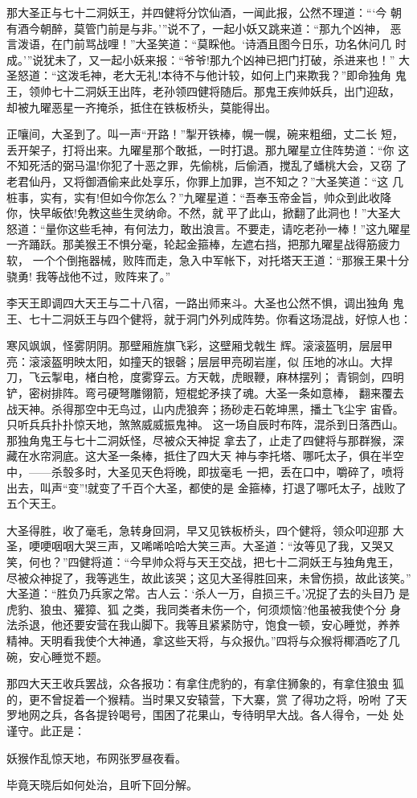 那大圣正与七十二洞妖王，并四健将分饮仙酒，一闻此报，公然不理道：“‘今
朝有酒今朝醉，莫管门前是与非。’”说不了，一起小妖又跳来道：“那九个凶神，
恶言泼语，在门前骂战哩！”大圣笑道：“莫睬他。‘诗酒且图今日乐，功名休问几
时成。’”说犹未了，又一起小妖来报：“爷爷!那九个凶神已把门打破，杀进来也！”
大圣怒道：“这泼毛神，老大无礼!本待不与他计较，如何上门来欺我？”即命独角
鬼王，领帅七十二洞妖王出阵，老孙领四健将随后。那鬼王疾帅妖兵，出门迎敌，
却被九曜恶星一齐掩杀，抵住在铁板桥头，莫能得出。

正嚷间，大圣到了。叫一声“开路！”掣开铁棒，幌一幌，碗来粗细，丈二长
短，丢开架子，打将出来。九曜星那个敢抵，一时打退。那九曜星立住阵势道：“你
这不知死活的弼马温!你犯了十恶之罪，先偷桃，后偷酒，搅乱了蟠桃大会，又窃
了老君仙丹，又将御酒偷来此处享乐，你罪上加罪，岂不知之？”大圣笑道：“这
几桩事，实有，实有!但如今你怎么？”九曜星道：“吾奉玉帝金旨，帅众到此收降
你，快早皈依!免教这些生灵纳命。不然，就平了此山，掀翻了此洞也！”大圣大
怒道：“量你这些毛神，有何法力，敢出浪言。不要走，请吃老孙一棒！”这九曜星
一齐踊跃。那美猴王不惧分毫，轮起金箍棒，左遮右挡，把那九曜星战得筋疲力软，
一个个倒拖器械，败阵而走，急入中军帐下，对托塔天王道：“那猴王果十分骁勇!
我等战他不过，败阵来了。”

李天王即调四大天王与二十八宿，一路出师来斗。大圣也公然不惧，调出独角
鬼王、七十二洞妖王与四个健将，就于洞门外列成阵势。你看这场混战，好惊人也：

寒风飒飒，怪雾阴阴。那壁厢旌旗飞彩，这壁厢戈戟生
辉。滚滚盔明，层层甲亮：滚滚盔明映太阳，如撞天的银磬；层层甲亮砌岩崖，似
压地的冰山。大捍刀，飞云掣电，楮白枪，度雾穿云。方天戟，虎眼鞭，麻林摆列；
青铜剑，四明铲，密树排阵。弯弓硬弩雕翎箭，短棍蛇矛挟了魂。大圣一条如意棒，
翻来覆去战天神。杀得那空中无鸟过，山内虎狼奔；扬砂走石乾坤黑，播土飞尘宇
宙昏。只听兵兵扑扑惊天地，煞煞威威振鬼神。
这一场自辰时布阵，混杀到日落西山。那独角鬼王与七十二洞妖怪，尽被众天神捉
拿去了，止走了四健将与那群猴，深藏在水帘洞底。这大圣一条棒，抵住了四大天
神与李托塔、哪吒太子，俱在半空中，——杀彀多时，大圣见天色将晚，即拔毫毛
一把，丢在口中，嚼碎了，喷将出去，叫声“变”!就变了千百个大圣，都使的是
金箍棒，打退了哪吒太子，战败了五个天王。

大圣得胜，收了毫毛，急转身回洞，早又见铁板桥头，四个健将，领众叩迎那
大圣，哽哽咽咽大哭三声，又唏唏哈哈大笑三声。大圣道：“汝等见了我，又哭又
笑，何也？”四健将道：“今早帅众将与天王交战，把七十二洞妖王与独角鬼王，
尽被众神捉了，我等逃生，故此该哭；这见大圣得胜回来，未曾伤损，故此该笑。”
大圣道：“胜负乃兵家之常。古人云：‘杀人一万，自损三千。’况捉了去的头目乃
是虎豹、狼虫、獾獐、狐之类，我同类者未伤一个，何须烦恼?他虽被我使个分
身法杀退，他还要安营在我山脚下。我等且紧紧防守，饱食一顿，安心睡觉，养养
精神。天明看我使个大神通，拿这些天将，与众报仇。”四将与众猴将椰酒吃了几
碗，安心睡觉不题。

那四大天王收兵罢战，众各报功：有拿住虎豹的，有拿住狮象的，有拿住狼虫
狐的，更不曾捉着一个猴精。当时果又安辕营，下大寨，赏了得功之将，吩咐
了天罗地网之兵，各各提铃喝号，围困了花果山，专待明早大战。各人得令，一处
处谨守。此正是：

妖猴作乱惊天地，布网张罗昼夜看。

毕竟天晓后如何处治，且听下回分解。